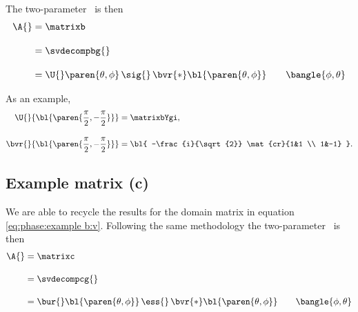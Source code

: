 The two-parameter \asvd \ is then
\begin{equation}
  \begin{split}
    \A{} 
      &= \matrixb \\[10pt]
      &= \svdecompbg{} \\[10pt]  
      &= \U{} \paren{\theta,\phi} \, \sig{}\, \bvr{*}\bl{ \paren{\theta,\phi} } 
         \qquad \bangle{ \phi, \theta }
  \end{split}
\end{equation}

As an example, 
\begin{equation}
  \begin{split}
    \U{}  {\bl{ \paren{\frac{\pi}{2}, -\frac{\pi}{2}} }} &= \matrixbYgi, \\[10pt]
    \bvr{}{\bl{ \paren{\frac{\pi}{2}, -\frac{\pi}{2}} }} &= {\bl{ -\frac{i}{\sqrt{2}} \mat{cr}{1&1 \\ 1&-1} }} .
  \end{split}
\end{equation}

\subsection{Example matrix (c)}
We are able to recycle the results for the domain matrix in equation \eqref{eq:phase:example b:v}. Following the same methodology the two-parameter \asvd \ is then
\begin{equation}
  \begin{split}
    \A{} 
      &= \matrixc \\[10pt]
      &= \svdecompcg{} \\[10pt]  
      &= \bur{}\bl{ \paren{\theta,\phi} } \, \ess{}\, \bvr{*}\bl{ \paren{\theta,\phi} } 
         \qquad \bangle{ \phi, \theta }
  \end{split}
\end{equation}


\endinput